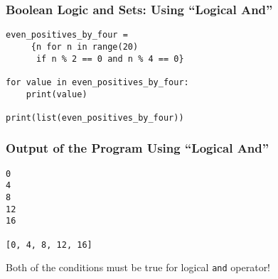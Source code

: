 \documentclass[14pt,aspectratio=169]{beamer}
\begin{document}
%
\begin{frame}[fragile]
  \frametitle{Boolean Logic and Sets: Using ``Logical And''}
  \normalsize
  \begin{minipage}{6in}
    \vspace*{.25in}
    \begin{verbatim}
even_positives_by_four =
     {n for n in range(20)
      if n % 2 == 0 and n % 4 == 0}

for value in even_positives_by_four:
    print(value)

print(list(even_positives_by_four))
    \end{verbatim}
  \end{minipage}
\end{frame}

%
\begin{frame}[fragile]
  \frametitle{Output of the Program Using ``Logical And''}
  \normalsize
  \begin{minipage}{6in}
    \vspace*{.15in}
    \begin{verbatim}
0
4
8
12
16

[0, 4, 8, 12, 16]
    \end{verbatim}
  \end{minipage}
  \vspace*{.05in}
  \begin{center}
    \normalsize \noindent Both of the conditions must be true for logical
    {\tt and} operator!\\
  \end{center}
\end{frame}
\end{document}
